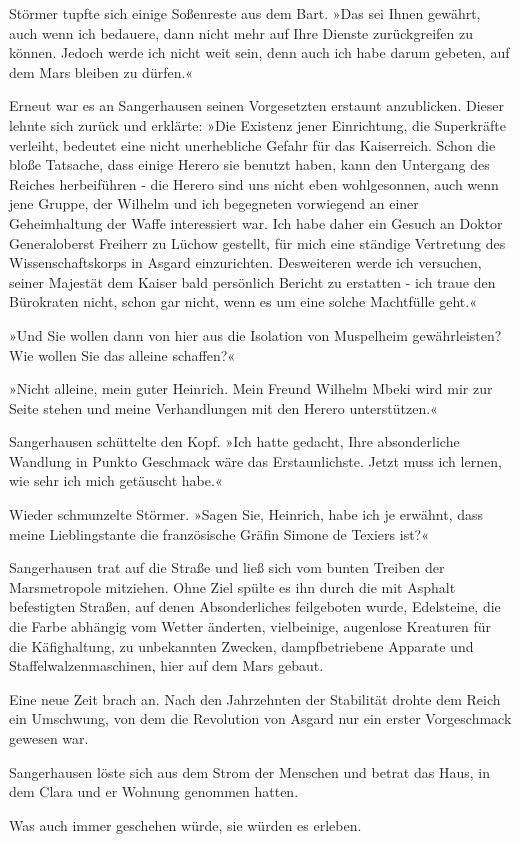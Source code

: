 Störmer tupfte sich einige Soßenreste aus dem Bart. »Das sei Ihnen
gewährt, auch wenn ich bedauere, dann nicht mehr auf Ihre Dienste
zurückgreifen zu können. Jedoch werde ich nicht weit sein, denn
auch ich habe darum gebeten, auf dem Mars bleiben zu dürfen.«

Erneut war es an Sangerhausen seinen Vorgesetzten erstaunt
anzublicken. Dieser lehnte sich zurück und erklärte: »Die Existenz
jener Einrichtung, die Superkräfte verleiht, bedeutet eine nicht
unerhebliche Gefahr für das Kaiserreich. Schon die bloße Tatsache,
dass einige Herero sie benutzt haben, kann den Untergang des
Reiches herbeiführen - die Herero sind uns nicht eben wohlgesonnen,
auch wenn jene Gruppe, der Wilhelm und ich begegneten vorwiegend an
einer Geheimhaltung der Waffe interessiert war. Ich habe daher ein
Gesuch an Doktor Generaloberst Freiherr zu Lüchow gestellt, für
mich eine ständige Vertretung des Wissenschaftskorps in Asgard
einzurichten. Desweiteren werde ich versuchen, seiner Majestät dem
Kaiser bald persönlich Bericht zu erstatten - ich traue den
Bürokraten nicht, schon gar nicht, wenn es um eine solche
Machtfülle geht.«

»Und Sie wollen dann von hier aus die Isolation von Muspelheim
gewährleisten? Wie wollen Sie das alleine schaffen?«

»Nicht alleine, mein guter Heinrich. Mein Freund Wilhelm Mbeki wird
mir zur Seite stehen und meine Verhandlungen mit den Herero
unterstützen.«

Sangerhausen schüttelte den Kopf. »Ich hatte gedacht, Ihre
absonderliche Wandlung in Punkto Geschmack wäre das Erstaunlichste.
Jetzt muss ich lernen, wie sehr ich mich getäuscht habe.«

Wieder schmunzelte Störmer. »Sagen Sie, Heinrich, habe ich je
erwähnt, dass meine Lieblingstante die französische Gräfin Simone
de Texiers ist?«

\bigpar

Sangerhausen trat auf die Straße und ließ sich vom bunten Treiben
der Marsmetropole mitziehen. Ohne Ziel spülte es ihn durch die mit
Asphalt befestigten Straßen, auf denen Absonderliches feilgeboten
wurde, Edelsteine, die die Farbe abhängig vom Wetter änderten,
vielbeinige, augenlose Kreaturen für die Käfighaltung, zu
unbekannten Zwecken, dampfbetriebene Apparate und
Staffelwalzenmaschinen, hier auf dem Mars gebaut.

Eine neue Zeit brach an. Nach den Jahrzehnten der Stabilität drohte
dem Reich ein Umschwung, von dem die Revolution von Asgard nur ein
erster Vorgeschmack gewesen war.

Sangerhausen löste sich aus dem Strom der Menschen und betrat das
Haus, in dem Clara und er Wohnung genommen hatten.

Was auch immer geschehen würde, sie würden es erleben.


